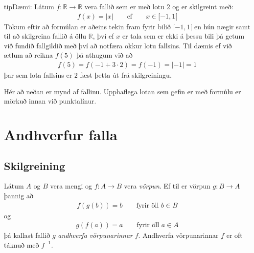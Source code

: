 \documentclass[a4paper,10pt,icelandic]{sphinxmanual}
\begin{document}
\begin{sphinxadmonition}{tip}{Dæmi:}
Látum \(f: \mathbb{R} \to \mathbb{R}\) vera fallið sem er með lotu \(2\) og er skilgreint með:
\begin{equation*}
\begin{split}f(x)=|x| \qquad \text{ef} \qquad x \in [-1,1[\end{split}
\end{equation*}
Tökum eftir að formúlan er aðeins tekin fram fyrir bilið \([-1,1[\) en hún nægir samt til að skilgreina fallið á öllu \(\mathbb{R}\), því ef \(x\) er tala sem er ekki á þessu bili þá getum við fundið fallgildið með því að notfæra okkur lotu fallsins. Til dæmis ef við ætlum að reikna \(f(5)\) þá athugum við að
\begin{equation*}
\begin{split}f(5)=f(-1+3 \cdot 2)=f(-1)=|-1|=1\end{split}
\end{equation*}
þar sem lota fallsins er \(2\) fæst þetta út frá skilgreiningu.

Hér að neðan er mynd af fallinu. Upphaflega lotan sem gefin er með formúlu er mörkuð innan við punktalínur.

\begin{figure}[H]
\centering

\noindent{}
\end{figure}
\end{sphinxadmonition}


\section{Andhverfur falla}
\label{\detokenize{Kafli05:andhverfur-falla}}

\subsection{Skilgreining}
\label{\detokenize{Kafli05:id3}}
Látum \(A\) og \(B\) vera mengi og \(f: A \to B\) vera \textit{vörpun}. Ef til er vörpun \(g: B \to A\) þannig að
\begin{equation*}
\begin{split}f(g(b))=b \qquad \text{fyrir öll } b \in B\end{split}
\end{equation*}
og
\begin{equation*}
\begin{split}g(f(a))=a \qquad \text{fyrir öll } a \in A\end{split}
\end{equation*}
þá kallast fallið \(g\) \textit{andhverfa vörpunarinnar} \(f\). Andhverfa vörpunarinnar \(f\) er oft táknuð með \(f^{-1}\).
\end{document}
